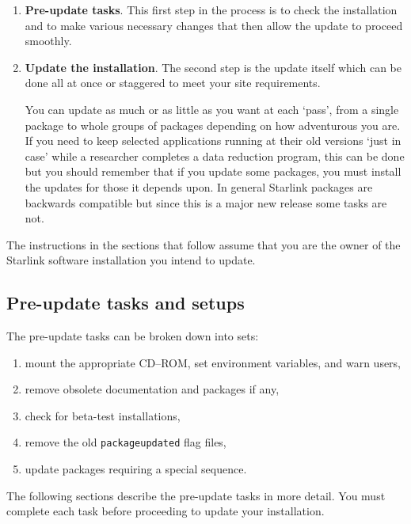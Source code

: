 \documentclass[twoside,11pt]{article}
\newcommand{\xlabel}[1]{}
\renewcommand{\_}{\texttt{\symbol{95}}}
\newcommand{\cdrom}{CD--ROM}
\newcommand{\cdrom}{CD-ROM}
\begin{document}
\begin{enumerate}

\item \textbf{Pre-update tasks}.  This first step in the process
is to check the installation and to make various necessary changes that
then allow the update to proceed smoothly.

\item \textbf{Update the installation}.  The second step is the update
itself which can be done all at once or staggered to meet your site
requirements.

You can update as much or as little as you want at each `pass', from
a single package to whole groups of packages depending on how adventurous
you are.  If you need to keep selected applications running at their
old versions `just in case' while a researcher completes a data
reduction program, this can be done but you should remember that if you
update some packages, you must install the updates for those it depends
upon.  In general Starlink packages are backwards compatible but since this
is a major new release some tasks are not.

\end{enumerate}

The instructions in the sections that follow assume that you are the
owner of the Starlink software installation you intend to update.

\subsection{\xlabel{pre-update_tasks_and_setups}Pre-update tasks and setups}
\label{pre-update_tasks_and_setups}

The pre-update tasks can be broken down into sets:

\begin{enumerate}
\item mount the appropriate \cdrom, set environment variables, and warn users,
\item remove obsolete documentation and packages if any,
\item check for beta-test installations,
\item remove the old \texttt{package\_updated} flag files,
\item update packages requiring a special sequence.
\end{enumerate}

The following sections describe the pre-update tasks in more detail.  You
must complete each task before proceeding to update your installation.
\end{document}
